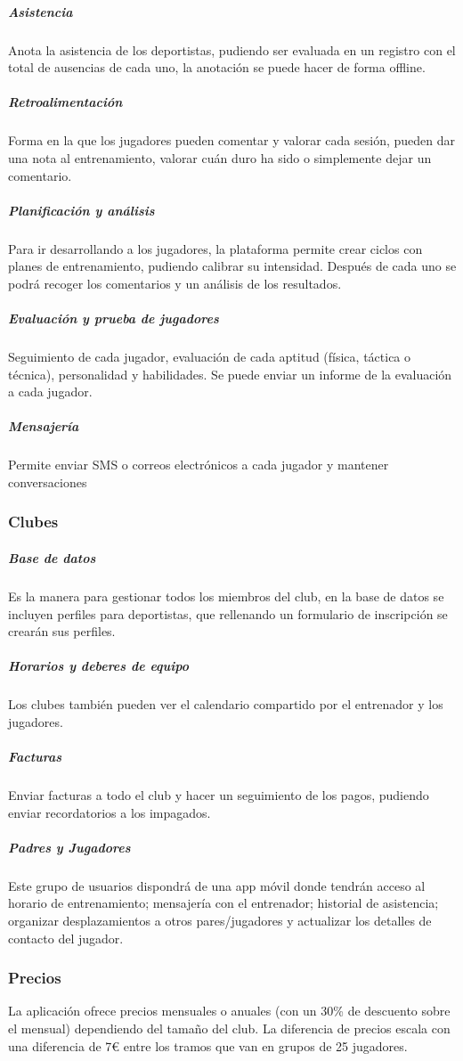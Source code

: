 \subparagraph{Asistencia}
Anota la asistencia de los deportistas, pudiendo ser evaluada en un registro con el total de ausencias de cada uno, la anotación se puede hacer de forma offline.

\subparagraph{Retroalimentación}
Forma en la que los jugadores pueden comentar y valorar cada sesión, pueden dar una nota al entrenamiento, valorar cuán duro ha sido o simplemente dejar un comentario.

\subparagraph{Planificación y análisis}
Para ir desarrollando a los jugadores, la plataforma permite crear ciclos con planes de entrenamiento, pudiendo calibrar su intensidad. Después de cada uno se podrá recoger los comentarios y un análisis de los resultados.

\subparagraph{Evaluación y prueba de jugadores}
Seguimiento de cada jugador, evaluación de cada aptitud (física, táctica o técnica), personalidad y habilidades. Se puede enviar un informe de la evaluación a cada jugador. 

\subparagraph{Mensajería}
Permite enviar SMS o correos electrónicos a cada jugador y mantener conversaciones


\subsubsection{Clubes}

\subparagraph{Base de datos}
Es la manera para gestionar todos los miembros del club, en la base de datos se incluyen perfiles para deportistas, que rellenando un formulario de inscripción se crearán sus perfiles.

\subparagraph{Horarios y deberes de equipo}
Los clubes también pueden ver el calendario compartido por el entrenador y los jugadores.

\subparagraph{Facturas}
Enviar facturas a todo el club y hacer un seguimiento de los pagos, pudiendo enviar recordatorios a los impagados.

\subparagraph{Padres y Jugadores}
Este grupo de usuarios dispondrá de una app móvil donde tendrán acceso al horario de entrenamiento; mensajería con el entrenador; historial de asistencia; organizar desplazamientos a otros pares/jugadores y actualizar los detalles de contacto del jugador.


\subsubsection{Precios}
La aplicación ofrece precios mensuales o anuales (con un 30\% de descuento sobre el mensual) dependiendo del tamaño del club. La diferencia de precios escala con una diferencia de 7€ entre los tramos que van en grupos de 25 jugadores.

